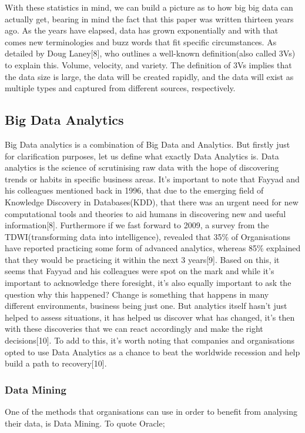\documentclass[10pt,journal,compsoc]{IEEEtran}
\begin{document}
With these statistics in mind, we can build a picture as to how big big data can actually get, bearing in mind the fact that this paper was written thirteen years ago. As the years have elapsed, data has grown exponentially and with that comes new terminologies and buzz words that fit specific circumstances. As detailed by Doug Laney[8], who outlines a well-known definition(also called 3Vs) to explain this. Volume, velocity, and variety. The definition of 3Vs implies that the data size is large, the data will be created rapidly, and the data will exist as multiple types and captured from different sources, respectively.

\subsection{Big Data Analytics}
Big Data analytics is a combination of Big Data and Analytics. But firstly just for clarification purposes, let us define what exactly Data Analytics is. Data analytics is the science of scrutinising raw data with the hope of discovering trends or habits in specific business areas. It's important to note that Fayyad and his colleagues mentioned back in 1996, that due to the emerging field of Knowledge Discovery in Databases(KDD), that there was an urgent need for new computational tools and theories to aid humans in discovering new and useful information[8]. Furthermore if we fast forward to 2009, a survey from the TDWI(transforming data into intelligence), revealed that 35\% of Organisations have reported practicing some form of advanced analytics, whereas 85\% explained that they would be practicing it within the next 3 years[9]. Based on this, it seems that Fayyad and his colleagues were spot on the mark and while it's important to acknowledge there foresight, it's also equally important to ask the question why this happened? Change is something that happens in many different environments, business being just one. But analytics itself hasn't just helped to assess situations, it has helped us discover what has changed, it's then with these discoveries that we can react accordingly and make the right decisions[10]. To add to this, it's worth noting that companies and organisations opted to use Data Analytics as a chance to beat the worldwide recession and help build a path to recovery[10].

\subsubsection{Data Mining} 
One of the methods that organisations can use in order to benefit from analysing their data, is Data Mining. To quote Oracle;
\end{document}
